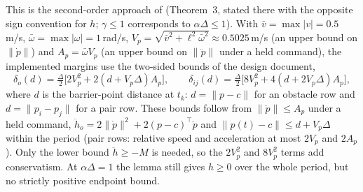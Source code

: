 \documentclass[11pt]{article}
\begin{document}
This is the second-order approach of \cite{breeden2022} (Theorem~3, stated there with the opposite
sign convention for $h$; $\gamma\le1$ corresponds to $\alpha\Delta\le1$). With
$\bar v=\max|v|=0.5$\,m/s, $\bar\omega=\max|\omega|=1$\,rad/s,
$V_p=\sqrt{\bar v^2+\ell^2\bar\omega^2}\approx0.5025$\,m/s (an upper bound on $\|\dot p\|$) and $A_p=\bar\omega V_p$ (an upper bound on $\|\ddot p\|$ under a held command), the implemented margins use the
two-sided bounds of the design document,
\begin{equation}
\delta_o(d)=\tfrac{\Delta}{2}\big[2V_p^2+2(d+V_p\Delta)A_p\big],\qquad
\delta_{ij}(d)=\tfrac{\Delta}{2}\big[8V_p^2+4(d+2V_p\Delta)A_p\big],
\end{equation}
where $d$ is the barrier-point distance at $t_k$: $d=\|p-c\|$ for an obstacle row and
$d=\|p_i-p_j\|$ for a pair row. These bounds follow from $\|\ddot p\|\le A_p$ under a held command,
$\ddot h_o=2\|\dot p\|^2+2(p-c)^\top\ddot p$ and $\|p(t)-c\|\le d+V_p\Delta$ within the period (pair
rows: relative speed and acceleration at most $2V_p$ and $2A_p$). Only the lower bound $\ddot h\ge-M$
is needed, so the $2V_p^2$ and $8V_p^2$ terms add conservatism. At $\alpha\Delta=1$ the lemma still gives
$h\ge0$ over the whole period, but no strictly positive endpoint bound.
\end{document}
